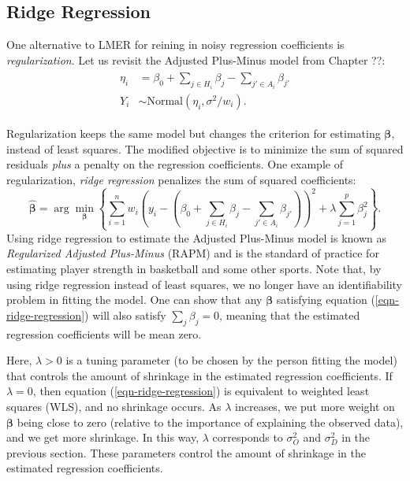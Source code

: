 \documentclass{article}
\begin{document}
  \subsection{\sc Ridge Regression}

  One alternative to LMER for reining in noisy regression coefficients is {\it regularization}. Let us revisit the Adjusted Plus-Minus model from Chapter ??:
  \begin{align*}
    \begin{split}
      \eta_i &= \beta_0 + \sum_{j \in H_i}\beta_{j} - \sum_{j' \in A_i}\beta_{j'}\\
      Y_i &\sim \mbox{Normal}(\eta_i, \sigma^2 / w_i).
    \end{split}
  \end{align*}

  Regularization keeps the same model but changes the criterion for estimating $\boldsymbol{\beta}$, instead of least squares. The modified objective is to minimize the sum of squared residuals {\it plus} a penalty on the regression coefficients. One example of regularization, {\it ridge regression} penalizes the sum of squared coefficients:
  \begin{equation}
    \label{eqn-ridge-regression}
    \boldsymbol{\hat\beta} = \arg\min_{\boldsymbol{\beta}} \left\{ \sum_{i=1}^n w_i \left(y_i - \left(\beta_0 + \sum_{j \in H_i}\beta_j - \sum_{j' \in A_i}\beta_{j'}\right)\right)^2 + \lambda \sum_{j = 1}^p \beta_j^2 \right\}.
  \end{equation}
  Using ridge regression to estimate the Adjusted Plus-Minus model is known as {\it Regularized Adjusted Plus-Minus} (RAPM) and is the standard of practice for estimating player strength in basketball and some other sports. Note that, by using ridge regression instead of least squares, we no longer have an identifiability problem in fitting the model. One can show that any $\boldsymbol{\beta}$ satisfying equation (\ref{eqn-ridge-regression}) will also satisfy $\sum_j \beta_j = 0$, meaning that the estimated regression coefficients will be mean zero.


  Here, $\lambda > 0$ is a tuning parameter (to be chosen by the person fitting the model) that controls the amount of shrinkage in the estimated regression coefficients. If $\lambda = 0$, then equation (\ref{eqn-ridge-regression}) is equivalent to weighted least squares (WLS), and no shrinkage occurs. As $\lambda$ increases, we put more weight on $\boldsymbol{\beta}$ being close to zero (relative to the importance of explaining the observed data), and we get more shrinkage. In this way, $\lambda$ corresponds to $\sigma^2_O$ and $\sigma^2_D$ in the previous section. These parameters control the amount of shrinkage in the estimated regression coefficients.
\end{document}
